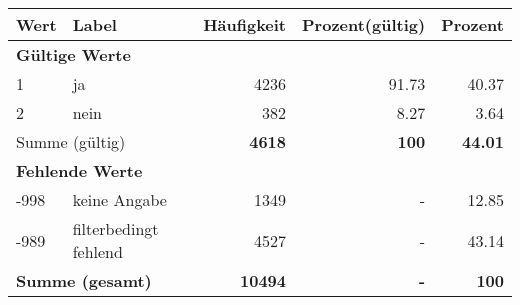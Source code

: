      \begin{longtable}{lXrrr}
     \toprule
     \textbf{Wert} & \textbf{Label} & \textbf{Häufigkeit} & \textbf{Prozent(gültig)} & \textbf{Prozent} \\
     \endhead
     \midrule
     \multicolumn{5}{l}{\textbf{Gültige Werte}}\\

     1 &
     \multicolumn{1}{X}{ ja   } &


       \num{4236} &
       \num[round-mode=places,round-precision=2]{91.73} &
         \num[round-mode=places,round-precision=2]{40.37} \\

     2 &
     \multicolumn{1}{X}{ nein   } &


       \num{382} &
       \num[round-mode=places,round-precision=2]{8.27} &
         \num[round-mode=places,round-precision=2]{3.64} \\
     \midrule
     \multicolumn{2}{l}{Summe (gültig)} &
       \textbf{\num{4618}} &
     \textbf{\num{100}} &
       \textbf{\num[round-mode=places,round-precision=2]{44.01}} \\
     \multicolumn{5}{l}{\textbf{Fehlende Werte}}\\
       -998 &
       keine Angabe &
         \num{1349} &
        - &
         \num[round-mode=places,round-precision=2]{12.85} \\
       -989 &
       filterbedingt fehlend &
         \num{4527} &
        - &
         \num[round-mode=places,round-precision=2]{43.14} \\
     \midrule
     \multicolumn{2}{l}{\textbf{Summe (gesamt)}} &
          \textbf{\num{10494}} &
        \textbf{-} &
        \textbf{\num{100}} \\
     \bottomrule
     \end{longtable}
     
